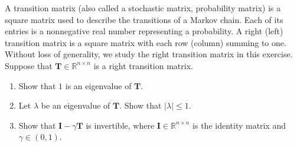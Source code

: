\documentclass[11pt,letter,notitlepage]{article}
\begin{document}
\newpage
\begin{exercise}
    A transition matrix (also called a stochastic matrix, probability matrix) is a square matrix used to describe the transitions of a Markov chain.
    Each of its entries is a nonnegative real number representing a probability.
    A right (left) transition matrix is a square matrix with each row (column) summing to one.
    Without loss of generality, we study the right transition matrix in this exercise.
    Suppose that $\textbf{T} \in \mathbb{R}^{n \times n}$ is a right transition matrix.
    \begin{enumerate}
        \item
        Show that $1$ is an eigenvalue of $\mathbf{T}$.
        \item
        Let $\lambda$ be an eigenvalue of $\mathbf{T}$. Show that $|\lambda|\le 1$.
        
        \item
        Show that $\mathbf{I}-\gamma \mathbf{T}$ is invertible, where $\mathbf{I}\in \mathbb{R}^{n\times n}$ is the identity matrix and $\gamma\in(0,1)$.
        
        
    \end{enumerate}
\end{exercise}
\begin{solution}${}$

\end{solution}
\end{document}
